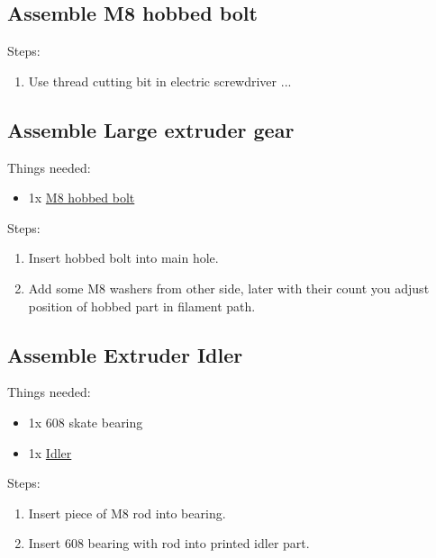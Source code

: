 \documentclass[11pt]{article}
\begin{document}
\subsection{Assemble M8 hobbed bolt}Steps:
\begin{enumerate}
\item Use thread cutting bit in electric screwdriver ...
\end{enumerate}

\subsection{Assemble Large extruder gear}
Things needed:
\begin{itemize}
\item 1x \hyperlink{thing_hobbed-bolt}{M8 hobbed bolt}
\end{itemize}
Steps:
\begin{enumerate}
\item Insert hobbed bolt into main hole.
\item Add some M8 washers from other side, later with their count you adjust position of hobbed part in filament path.
\end{enumerate}

\subsection{Assemble Extruder Idler}
Things needed:
\begin{itemize}
\item 1x 608 skate bearing
\item 1x \hyperlink{thing_idler-m8-piece}{Idler}
\end{itemize}
Steps:
\begin{enumerate}
\item Insert piece of M8 rod into bearing.
\item Insert 608 bearing with rod into printed idler part.
\end{enumerate}
\end{document}
